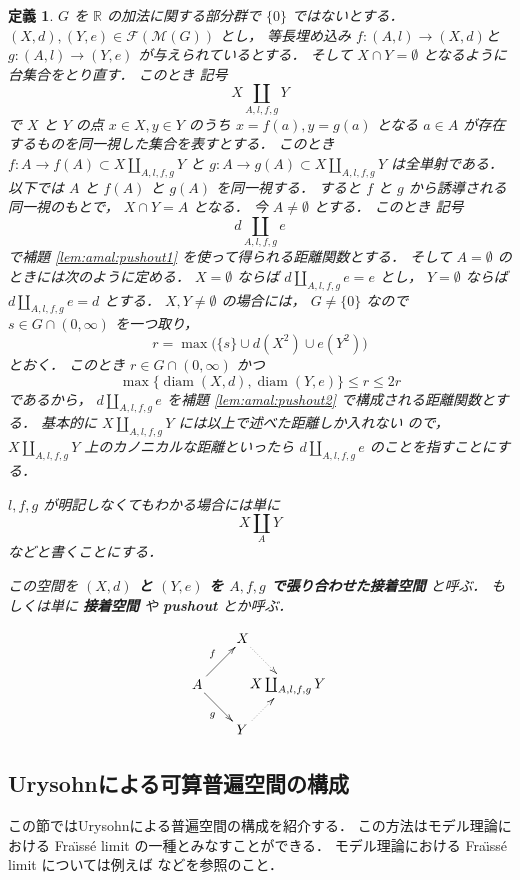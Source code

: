 \documentclass[leqno, 12pt]{jsarticle}
\newtheorem{df}[thm]{定義}
\newcommand{\rr}{\mathbb{R}}
\DeclareMathOperator{\di}{diam}
\newcommand{\Met}[1]{\mathscr{M}(#1)}
\newcommand{\FinitePart}[1]{\mathscr{F}(#1)}
\newcommand{\FinMet}[1]{\FinitePart{\Met{#1}}}
\begin{document}
\begin{df}\label{df:amal:pushoutspace}
$G$
を
$\rr$
の加法に関する部分群で
$\{0\}$
ではないとする．
$(X, d), (Y, e)\in \FinMet{G}$
とし，
等長埋め込み
$f\colon (A, l)\to (X, d)$と
$g\colon  (A, l)\to (Y, e)$
が与えられているとする．
そして
$X\cap Y=\emptyset$
となるように台集合をとり直す．
このとき
記号
\[
X\coprod_{A, l, f, g}Y
\]
で
$X$
と
$Y$
の点
$x\in X, y\in Y$
のうち
$x=f(a), y=g(a)$
となる
$a\in A$
が存在するものを同一視した集合を表すとする．
このとき
$f\colon  A\to f(A)\subset X\coprod_{A, l, f, g}Y
$
と
$g\colon  A\to g(A)\subset X\coprod_{A, l, f, g}Y
$
は全単射である．
以下では
$A$
と
$f(A)$
と
$g(A)$
を同一視する．
すると
$f$
と
$g$
から誘導される同一視のもとで，
$X\cap Y=A$
となる．
今
$A\neq \emptyset$
とする．
このとき
記号
\[
d\coprod_{A, l, f, g}e
\]
で補題
\ref{lem:amal:pushout1}
を使って得られる距離関数とする．
そして
$A=\emptyset$
のときには次のように定める．
$X=\emptyset$
ならば
$d\coprod_{A,l,f,g}e=e$
とし，
$Y=\emptyset$
ならば
$d\coprod_{A,l,f,g}e=d$
とする．
$X,Y\neq\emptyset$
の場合には，
$G\neq\{0\}$
なので
$s\in G\cap(0,\infty)$
を一つ取り，
\[
r=\max\bigl(\{s\}\cup d(X^2)\cup e(Y^2)\bigr)
\]
とおく．
このとき
$r\in G\cap(0,\infty)$
かつ
\[
\max\{\di(X,d),\di(Y,e)\}\le r\le 2r
\]
であるから，
$d\coprod_{A,l,f,g}e$
を補題
\ref{lem:amal:pushout2}
で構成される距離関数とする．
基本的に
$X\coprod_{A, l, f, g}Y$
には以上で述べた距離しか入れない
ので，
$X\coprod_{A, l, f, g}Y$
上のカノニカルな距離といったら
$d\coprod_{A, l, f, g}e$
のことを指すことにする．

$l, f, g$
が明記しなくてもわかる場合には単に
\[
X\coprod_{A}Y
\]
などと書くことにする．

この空間を
\textbf{%
$(X, d)$%
と%
$(Y, e)$%
を%
$A, f, g$%
で張り合わせた接着空間}
と呼ぶ．
もしくは単に
\textbf{接着空間}
や
\textbf{pushout}
とか呼ぶ．

  \[
   \xymatrix@ur{
A \ar[r]^f \ar[d]_g & X \ar@{.>}[d] \\
Y \ar@{.>}[r] & X\coprod_{A, l, f, g}Y
 & }
\]


\end{df}

\subsection{Urysohnによる可算普遍空間の構成}\label{subsec:amalgamation:urysohn}
この節ではUrysohnによる普遍空間の構成を紹介する．
この方法はモデル理論における
Fra\"{\i}ss\'{e} limit
の一種とみなすことができる．
モデル理論における
Fra\"{\i}ss\'{e} limit
については例えば
\cite{Hodges}などを参照のこと．
\end{document}
